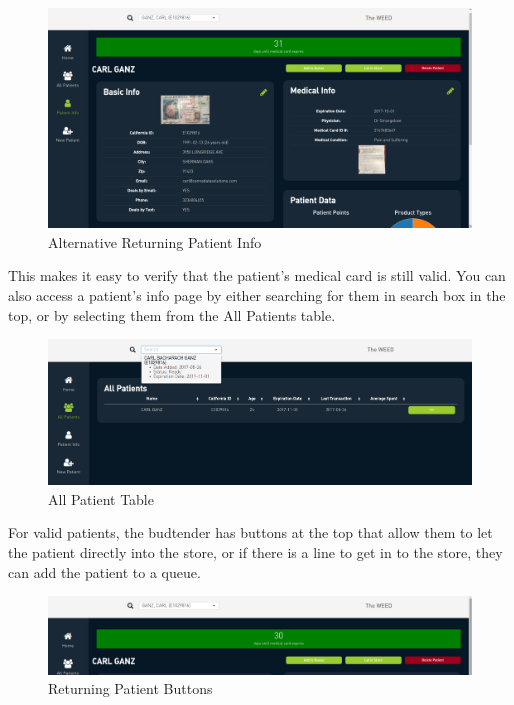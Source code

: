 \documentclass[]{book}
\theoremstyle{definition}
\theoremstyle{definition}
\theoremstyle{definition}
\theoremstyle{remark}
\begin{document}
\begin{figure}
\centering
\includegraphics{images/FDalt.png}
\caption{Alternative Returning Patient Info}
\end{figure}

This makes it easy to verify that the patient's medical card is still
valid. You can also access a patient's info page by either searching for
them in search box in the top, or by selecting them from the All
Patients table.

\begin{figure}
\centering
\includegraphics{images/FD3.png}
\caption{All Patient Table}
\end{figure}

For valid patients, the budtender has buttons at the top that allow them
to let the patient directly into the store, or if there is a line to get
in to the store, they can add the patient to a queue.

\begin{figure}
\centering
\includegraphics{images/FD12.png}
\caption{Returning Patient Buttons}
\end{figure}
\end{document}

